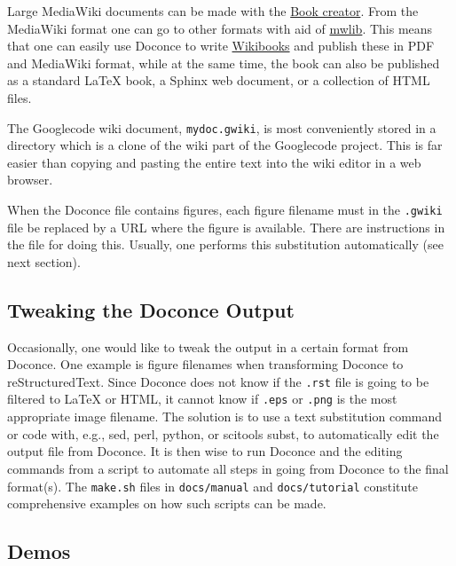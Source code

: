 \documentclass[%
oneside,                 %
final,                   %
10pt]{article}
\begin{document}
Large MediaWiki documents can be made with the
\href{{http://en.wikipedia.org/w/index.php?title=Special:Book&bookcmd=book_creator}}{Book creator}.
From the MediaWiki format one can go to other formats with aid
of \href{{http://pediapress.com/code/}}{mwlib}. This means that one can
easily use Doconce to write \href{{http://en.wikibooks.org}}{Wikibooks}
and publish these in PDF and MediaWiki format, while
at the same time, the book can also be published as a
standard {\LaTeX} book, a Sphinx web document, or a collection of HTML files.



The Googlecode wiki document, {\fontsize{10pt}{10pt}\Verb!mydoc.gwiki!}, is most conveniently stored
in a directory which is a clone of the wiki part of the Googlecode project.
This is far easier than copying and pasting the entire text into the
wiki editor in a web browser.

When the Doconce file contains figures, each figure filename must in
the {\fontsize{10pt}{10pt}\Verb!.gwiki!} file be replaced by a URL where the figure is
available. There are instructions in the file for doing this. Usually,
one performs this substitution automatically (see next section).

\subsection{Tweaking the Doconce Output}

Occasionally, one would like to tweak the output in a certain format
from Doconce. One example is figure filenames when transforming
Doconce to reStructuredText. Since Doconce does not know if the
{\fontsize{10pt}{10pt}\Verb!.rst!} file is going to be filtered to {\LaTeX} or HTML, it cannot know
if {\fontsize{10pt}{10pt}\Verb!.eps!} or {\fontsize{10pt}{10pt}\Verb!.png!} is the most appropriate image filename.
The solution is to use a text substitution command or code with, e.g., sed,
perl, python, or scitools subst, to automatically edit the output file
from Doconce. It is then wise to run Doconce and the editing commands
from a script to automate all steps in going from Doconce to the final
format(s). The {\fontsize{10pt}{10pt}\Verb!make.sh!} files in {\fontsize{10pt}{10pt}\Verb!docs/manual!} and {\fontsize{10pt}{10pt}\Verb!docs/tutorial!}
constitute comprehensive examples on how such scripts can be made.


\subsection{Demos}
\end{document}
